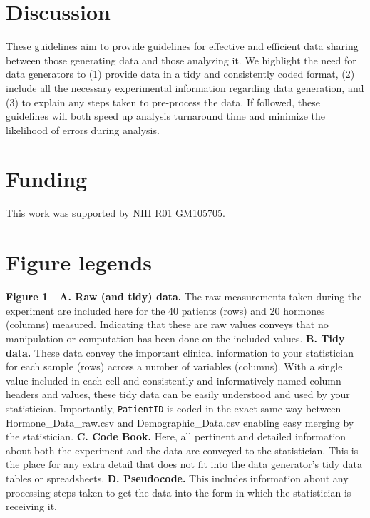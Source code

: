 \documentclass[12pt]{article}
\begin{document}
\section{Discussion}
\label{sec:discussion}

These guidelines aim to provide guidelines for effective and efficient
data sharing between those generating data and those analyzing it. We
highlight the need for data generators to (1) provide data in a tidy and
consistently coded format, (2) include all the necessary experimental
information regarding data generation, and (3) to explain any steps
taken to pre-process the data. If followed, these guidelines will both
speed up analysis turnaround time and minimize the likelihood of errors
during analysis.

\section{Funding}
\label{sec:funding}

This work was supported by NIH R01 GM105705.

\section{Figure legends}
\label{sec:figlegend}

\textbf{Figure 1} -- \textbf{A. Raw (and tidy) data.} The raw
measurements taken during the experiment are included here for the 40
patients (rows) and 20 hormones (columns) measured. Indicating that
these are raw values conveys that no manipulation or computation has
been done on the included values. \textbf{B. Tidy data.} These data
convey the important clinical information to your statistician for each
sample (rows) across a number of variables (columns). With a single
value included in each cell and consistently and informatively named
column headers and values, these tidy data can be easily understood and
used by your statistician. Importantly, \texttt{PatientID} is coded in
the exact same way between Hormone\_Data\_raw.csv and
Demographic\_Data.csv enabling easy merging by the statistician.
\textbf{C. Code Book.} Here, all pertinent and detailed information
about both the experiment and the data are conveyed to the statistician.
This is the place for any extra detail that does not fit into the data
generator's tidy data tables or spreadsheets. \textbf{D. Pseudocode.}
This includes information about any processing steps taken to get the
data into the form in which the statistician is receiving it.



\end{document}
